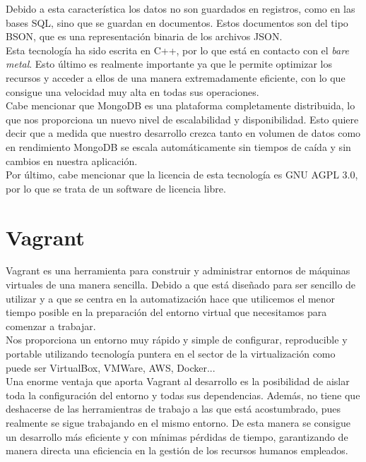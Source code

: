 Debido a esta característica los datos no son guardados en registros, como en las bases SQL, 
sino que se guardan en documentos. Estos documentos son del tipo BSON, que es una representación
binaria de los archivos JSON.\\

Esta tecnología ha sido escrita en C++, por lo que está en contacto con el \textit{bare metal}. Esto
último es realmente importante ya que le permite optimizar los recursos y acceder a ellos de una 
manera extremadamente eficiente, con lo que consigue una velocidad muy alta en todas sus operaciones.\\

Cabe mencionar que MongoDB es una plataforma completamente distribuida, lo que nos proporciona 
un nuevo nivel de escalabilidad y disponibilidad. Esto quiere decir que a medida que nuestro desarrollo
crezca tanto en volumen de datos como en rendimiento MongoDB se escala automáticamente sin tiempos
de caída y sin cambios en nuestra aplicación.\\

Por último, cabe mencionar que la licencia de esta tecnología es GNU AGPL 3.0, por lo que se trata de un software de licencia
libre.


\section{Vagrant}

Vagrant es una herramienta para construir y administrar entornos de máquinas virtuales de una 
manera sencilla. Debido a que está diseñado para ser sencillo de utilizar y a que se centra en 
la automatización hace que utilicemos el menor tiempo posible en la preparación del entorno virtual
que necesitamos para comenzar a trabajar.\\

Nos proporciona un entorno muy rápido y simple de configurar, reproducible y portable utilizando
tecnología puntera en el sector de la virtualización como puede ser VirtualBox, VMWare, AWS, Docker...\\

Una enorme ventaja que aporta Vagrant al desarrollo es la posibilidad de aislar toda la configuración
del entorno y todas sus dependencias. Además, no tiene que deshacerse de las herramientras de trabajo
a las que está acostumbrado, pues realmente se sigue trabajando en el mismo entorno. 
De esta manera se consigue un desarrollo más eficiente y con mínimas pérdidas de tiempo, garantizando 
de manera directa una eficiencia en la gestión de los recursos humanos empleados.\\

